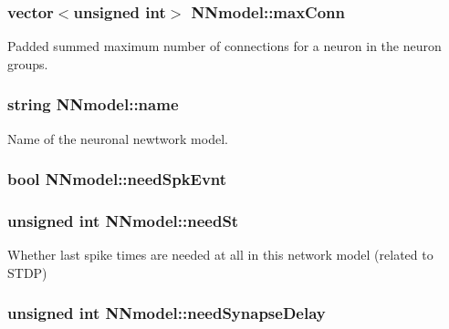 \hypertarget{classNNmodel_afd62bf5791467b37ef06b025ae419d36}{
\subsubsection[{max\+Conn}]{\setlength{\rightskip}{0pt plus 5cm}vector$<$unsigned int$>$ N\+Nmodel\+::max\+Conn}}\label{classNNmodel_afd62bf5791467b37ef06b025ae419d36}


Padded summed maximum number of connections for a neuron in the neuron groups. 

\hypertarget{classNNmodel_a7d81556b7b15a4a625b23f965944dae9}{
\subsubsection[{name}]{\setlength{\rightskip}{0pt plus 5cm}string N\+Nmodel\+::name}}\label{classNNmodel_a7d81556b7b15a4a625b23f965944dae9}


Name of the neuronal newtwork model. 

\hypertarget{classNNmodel_a17091f9688dbfa4e9f2d83181a1b554a}{
\subsubsection[{need\+Spk\+Evnt}]{\setlength{\rightskip}{0pt plus 5cm}bool N\+Nmodel\+::need\+Spk\+Evnt}}\label{classNNmodel_a17091f9688dbfa4e9f2d83181a1b554a}
\hypertarget{classNNmodel_ab5f42229881455bed0f484b6d0211795}{
\subsubsection[{need\+St}]{\setlength{\rightskip}{0pt plus 5cm}unsigned int N\+Nmodel\+::need\+St}}\label{classNNmodel_ab5f42229881455bed0f484b6d0211795}


Whether last spike times are needed at all in this network model (related to S\+T\+D\+P) 

\hypertarget{classNNmodel_aa6753d648bcac06109f0820349b5d2be}{
\subsubsection[{need\+Synapse\+Delay}]{\setlength{\rightskip}{0pt plus 5cm}unsigned int N\+Nmodel\+::need\+Synapse\+Delay}}\label{classNNmodel_aa6753d648bcac06109f0820349b5d2be}



